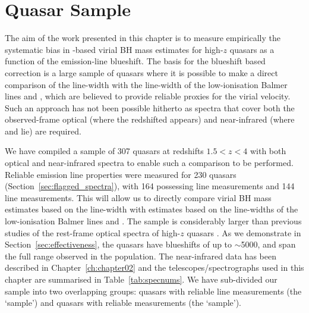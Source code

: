 \section{Quasar Sample}

The aim of the work presented in this chapter is to measure empirically the systematic bias in -based virial BH mass estimates for high-$z$ quasars as a function of the  emission-line blueshift. 
The basis for the  blueshift based correction is a large sample of quasars where it is possible to make a direct comparison of the  line-width with the line-width of the low-ionisation Balmer lines \ha and \hbns, which are believed to provide reliable proxies for the virial velocity. 
Such an approach has not been possible hitherto as spectra that cover both the observed-frame optical (where the redshifted  appears) and near-infrared (where \hb and \ha lie) are required.

We have compiled a sample of 307 quasars at redshifts $1.5 < z < 4$ with both optical and near-infrared spectra to enable such a comparison to be performed. 
Reliable emission line properties were measured for 230 quasars (Section~\ref{sec:flagged_spectra}), with 164 possessing \ha line measurements and 144 \hb line measurements.  
This will allow us to directly compare virial BH mass estimates based on the  line-width with estimates based on the line-widths of the low-ionisation Balmer lines \ha and \hbns.  
The sample is considerably larger than previous studies of the rest-frame optical spectra of high-$z$ quasars \citep[e.g.][]{shen12}. 
As we demonstrate in Section~\ref{sec:effectiveness}, the quasars have  blueshifts of up to $\sim$5000\kms, and span the full range observed in the population. 
The near-infrared data has been described in Chapter~\ref{ch:chapter02} and the telescopes/spectrographs used in this chapter are summarised in Table~\ref{tab:specnums}. 
We have sub-divided our sample into two overlapping groups: quasars with reliable \ha line measurements (the `\ha sample') and quasars with reliable \hb measurements (the `\hb sample').


